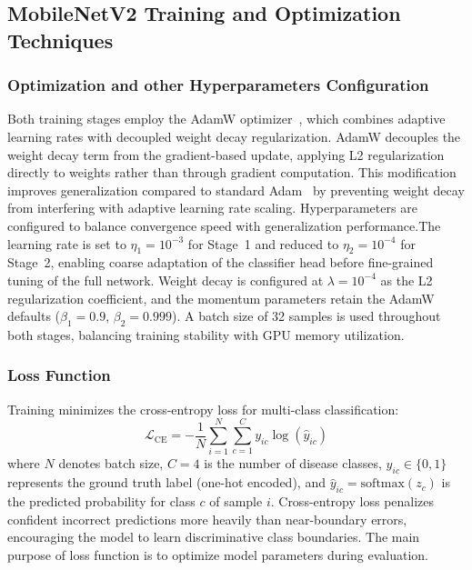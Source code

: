 \subsection{MobileNetV2 Training and Optimization Techniques}

\subsubsection*{Optimization and other Hyperparameters Configuration}

Both training stages employ the AdamW optimizer~\cite{loshchilov2017decoupled}, which combines adaptive learning rates with decoupled weight decay regularization. AdamW decouples the weight decay term from the gradient-based update, applying L2 regularization directly to weights rather than through gradient computation. This modification improves generalization compared to standard Adam~\cite{kingma2014adam} by preventing weight decay from interfering with adaptive learning rate scaling.
Hyperparameters are configured to balance convergence speed with generalization performance.The learning rate is set to $\eta_1 = 10^{-3}$ for Stage~1 and reduced to $\eta_2 = 10^{-4}$ for Stage~2, enabling coarse adaptation of the classifier head before fine-grained tuning of the full network. Weight decay is configured at $\lambda = 10^{-4}$ as the L2 regularization coefficient, and the momentum parameters retain the AdamW defaults ($\beta_1 = 0.9$, $\beta_2 = 0.999$). A batch size of 32 samples is used throughout both stages, balancing training stability with GPU memory utilization.

\subsubsection*{Loss Function}

Training minimizes the cross-entropy loss for multi-class classification:
\begin{equation}
\mathcal{L}_{\text{CE}} = -\frac{1}{N} \sum_{i=1}^{N} \sum_{c=1}^{C} y_{ic} \log(\hat{y}_{ic})
\end{equation}
where $N$ denotes batch size, $C=4$ is the number of disease classes, $y_{ic} \in \{0,1\}$ represents the ground truth label (one-hot encoded), and $\hat{y}_{ic} = \text{softmax}(z_c)$ is the predicted probability for class $c$ of sample $i$. Cross-entropy loss penalizes confident incorrect predictions more heavily than near-boundary errors, encouraging the model to learn discriminative class boundaries. The main purpose of loss function is to optimize model parameters during evaluation. 

